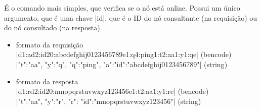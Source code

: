 
{}

É o comando mais simples, que verifica se o nó está online. Possui um único argumento,
que é uma chave \bverb|id|, que é o ID do nó consultante (na requisição) ou do nó
consultado (na resposta).

\begin{itemize}
    \item formato da requisição \\
        \bverb|d1:ad2:id20:abcdefghij0123456789e1:q4:ping1:t2:aa1:y1:qe|
        (\gls*{bencode}) \\
        \sverb|{"t":"aa", "y":"q", "q":"ping", "a":{"id":"abcdefghij0123456789"}}|
        (\gls*{string})

    \item formato da resposta \\
        \bverb|d1:rd2:id20:mnopqrstuvwxyz123456e1:t2:aa1:y1:re|
        (\gls*{bencode}) \\
        \sverb|{"t":"aa", "y":"r", "r": {"id":"mnopqrstuvwxyz123456"}}|
        (\gls*{string})
\end{itemize}

